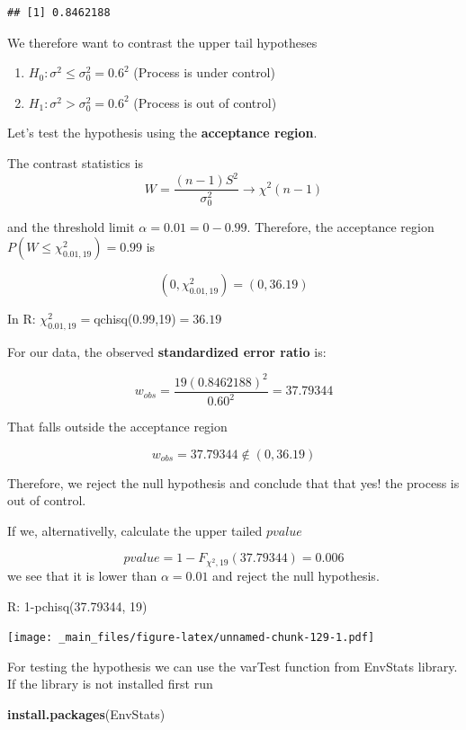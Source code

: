 \documentclass[
]{book}
\newenvironment{Shaded}{\begin{snugshade}}{\end{snugshade}}
\newcommand{\FunctionTok}[1]{\textcolor[rgb]{0.13,0.29,0.53}{\textbf{#1}}}
\newcommand{\NormalTok}[1]{#1}
\providecommand{\tightlist}{%
  \setlength{\itemsep}{0pt}\setlength{\parskip}{0pt}}
\begin{document}
\begin{verbatim}
## [1] 0.8462188
\end{verbatim}

We therefore want to contrast the upper tail hypotheses

\begin{enumerate}
\def\labelenumi{\alph{enumi}.}
\tightlist
\item
  \(H_0:\sigma^2 \leq \sigma_0^2=0.6^2\) (Process is under control)
\item
  \(H_1:\sigma^2 > \sigma_0^2=0.6^2\) (Process is out of control)
\end{enumerate}

Let's test the hypothesis using the \textbf{acceptance region}.

The contrast statistics is \[W=\frac{(n-1)S^2}{\sigma_0^2} \rightarrow \chi^2(n-1)\]

and the threshold limit \(\alpha=0.01=0-0.99\). Therefore, the acceptance region \(P(W\leq \chi^2_{0.01,19})=0.99\) is

\[(0, \chi^2_{0.01,19})=(0,36.19)\]

In R: \(\chi^2_{0.01,19}=\)qchisq(0.99,19)\(= 36.19\)

For our data, the observed \textbf{standardized error ratio} is:

\[w_{obs}=\frac{19 (0.8462188)^2}{0.60^2}=37.79344\]

That falls outside the acceptance region

\[w_{obs}=37.79344\notin (0,36.19)\]

Therefore, we reject the null hypothesis and conclude that that yes! the process is out of control.

If we, alternativelly, calculate the upper tailed \(pvalue\)

\[pvalue=1-F_{\chi^2,19}(37.79344)= 0.006\]
we see that it is lower than \(\alpha=0.01\) and reject the null hypothesis.

R: 1-pchisq(37.79344, 19)

\texttt{[image: \_main\_files/figure-latex/unnamed-chunk-129-1.pdf]}

For testing the hypothesis we can use the varTest function from EnvStats library. If the library is not installed first run

\begin{Shaded}
\begin{Highlighting}[]
\FunctionTok{install.packages}\NormalTok{(EnvStats)}
\end{Highlighting}
\end{Shaded}
\end{document}

